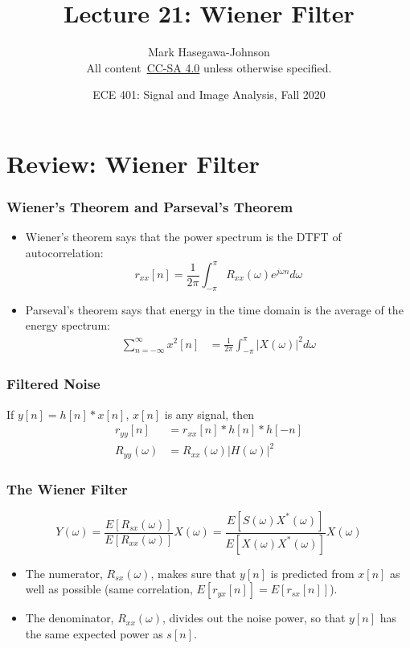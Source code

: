 \documentclass{beamer}
\title{Lecture 21: Wiener Filter}
\author{Mark Hasegawa-Johnson\\All content~\href{https://creativecommons.org/licenses/by-sa/4.0/}{CC-SA 4.0} unless otherwise specified.}
\date{ECE 401: Signal and Image Analysis, Fall 2020}
\begin{document}
\begin{frame}
  \maketitle
\end{frame}

\begin{frame}
  \tableofcontents
\end{frame}

\section[Review]{Review: Wiener Filter}
\setcounter{subsection}{1}

\begin{frame}
  \frametitle{Wiener's Theorem and Parseval's Theorem}
  \begin{itemize}
  \item Wiener's theorem says that the power spectrum is the DTFT of
    autocorrelation:
    \begin{displaymath}
      r_{xx}[n] = \frac{1}{2\pi}\int_{-\pi}^\pi R_{xx}(\omega)e^{j\omega n}d\omega
    \end{displaymath}
  \item Parseval's theorem says that energy in the time domain
    is the average of the energy spectrum:
    \begin{align*}
      \sum_{n=-\infty}^\infty x^2[n] &= \frac{1}{2\pi}\int_{-\pi}^\pi |X(\omega)|^2d\omega
    \end{align*}
  \end{itemize}
\end{frame}

\begin{frame}
  \frametitle{Filtered Noise}

  If $y[n]=h[n]\ast x[n]$, $x[n]$ is any signal, then
  \begin{align*}
    r_{yy}[n] &= r_{xx}[n]\ast h[n]\ast h[-n]\\
    R_{yy}(\omega) &= R_{xx}(\omega) |H(\omega)|^2
  \end{align*}
\end{frame}

\begin{frame}
  \frametitle{The Wiener Filter}

  \begin{displaymath}
    Y(\omega) = \frac{E\left[R_{sx}(\omega)\right]}{E\left[R_{xx}(\omega)\right]} X(\omega)
    = \frac{E\left[S(\omega)X^*(\omega)\right]}{E\left[X(\omega)X^*(\omega)\right]} X(\omega)
  \end{displaymath}
  \begin{itemize}
  \item The numerator, $R_{sx}(\omega)$, makes sure that $y[n]$ is
    predicted from $x[n]$ as well as possible (same correlation,
    $E\left[r_{yx}[n]\right]=E\left[r_{sx}[n]\right]$).
  \item The denominator, $R_{xx}(\omega)$, divides out the noise
    power, so that $y[n]$ has the same expected power as $s[n]$.
  \end{itemize}
\end{frame}
\end{document}
